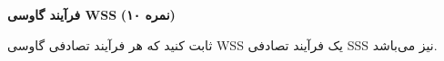 \Large \textbf{فرآیند گاوسی WSS}
\large \textbf{(۱۰ نمره)}

\normalsize \vspace{0.5cm}
ثابت کنید که هر فرآیند تصادفی گاوسی WSS یک فرآیند تصادفی SSS نیز می‌باشد.